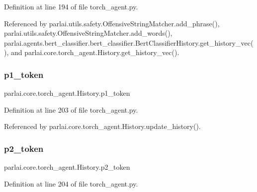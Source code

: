 Definition at line 194 of file torch\+\_\+agent.\+py.



Referenced by parlai.\+utils.\+safety.\+Offensive\+String\+Matcher.\+add\+\_\+phrase(), parlai.\+utils.\+safety.\+Offensive\+String\+Matcher.\+add\+\_\+words(), parlai.\+agents.\+bert\+\_\+classifier.\+bert\+\_\+classifier.\+Bert\+Classifier\+History.\+get\+\_\+history\+\_\+vec(), and parlai.\+core.\+torch\+\_\+agent.\+History.\+get\+\_\+history\+\_\+vec().

\mbox{\label{classparlai_1_1core_1_1torch__agent_1_1History_a7eff0681e0eee4051abb530797f15884}} 
\subsubsection{\texorpdfstring{p1\+\_\+token}{p1\_token}}
{\footnotesize\ttfamily parlai.\+core.\+torch\+\_\+agent.\+History.\+p1\+\_\+token}



Definition at line 203 of file torch\+\_\+agent.\+py.



Referenced by parlai.\+core.\+torch\+\_\+agent.\+History.\+update\+\_\+history().

\mbox{\label{classparlai_1_1core_1_1torch__agent_1_1History_ab9f9f10b0dd73d90d3798fb3e1787ee6}} 
\subsubsection{\texorpdfstring{p2\+\_\+token}{p2\_token}}
{\footnotesize\ttfamily parlai.\+core.\+torch\+\_\+agent.\+History.\+p2\+\_\+token}



Definition at line 204 of file torch\+\_\+agent.\+py.



